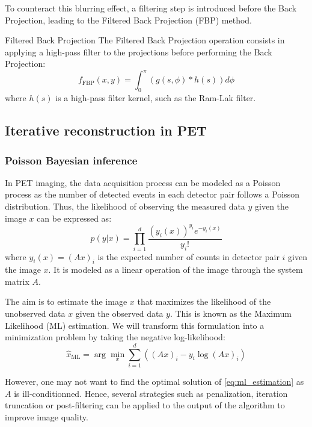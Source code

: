 To counteract this blurring effect, a filtering step is introduced before the Back Projection, leading to the Filtered Back Projection (FBP) method.

\begin{definition}{Filtered Back Projection}
    The Filtered Back Projection operation consists in applying a high-pass filter to the projections before performing the Back Projection:
    \begin{equation}
        f_{\text{FBP}}(x, y) = \int_{0}^{\pi} \left( g(s, \phi) * h(s) \right) d\phi
    \end{equation}
    where $h(s)$ is a high-pass filter kernel, such as the Ram-Lak filter.
\end{definition}

\subsection{Iterative reconstruction in PET}

\subsubsection{Poisson Bayesian inference}

In PET imaging, the data acquisition process can be modeled as a Poisson process as the number of detected events in each detector pair follows a Poisson distribution.
Thus, the likelihood of observing the measured data $y$ given the image $x$ can be expressed as:
\begin{equation}
    p(y|x) = \prod_{i=1}^{d} \frac{(y_i(x))^{y_i} e^{-y_i(x)}}{y_i!}
\end{equation}
where $y_i(x) = (Ax)_i$ is the expected number of counts in detector pair $i$ given the image $x$. It is modeled as a linear operation of the image through the system matrix $A$. 

The aim is to estimate the image $x$ that maximizes the likelihood of the unobserved data $x$ given the observed data $y$. This is known as the Maximum Likelihood (ML) estimation. We will transform this formulation into a minimization problem by taking the negative log-likelihood:
\begin{equation}
    \hat{x}_{\text{ML}} = \arg \min_{x} \sum_{i=1}^{d} \left( (Ax)_i - y_i \log (Ax)_i\right)
    \label{eq:ml_estimation}
\end{equation}

However, one may not want to find the optimal solution of \eqref{eq:ml_estimation} as $A$ is ill-conditionned. Hence, several strategies such as penalization, iteration truncation or post-filtering can be applied to the output of the algorithm to improve image quality.


